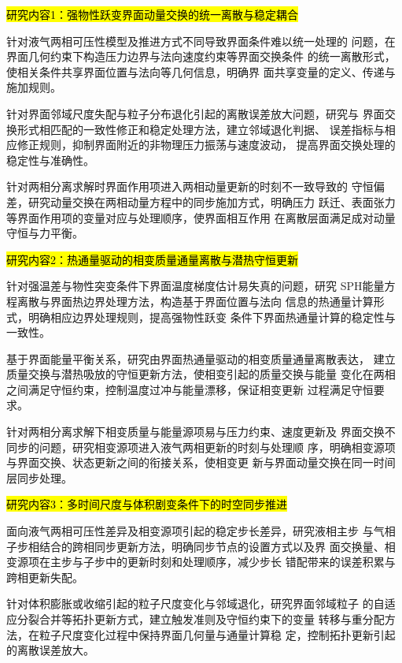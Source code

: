 \hl{\zhhei 研究内容1：强物性跃变界面动量交换的统一离散与稳定耦合}

针对液气两相可压性模型及推进方式不同导致界面条件难以统一处理的
问题，在界面几何约束下构造压力边界与法向速度约束等界面交换条件
的统一离散形式，使相关条件共享界面位置与法向等几何信息，明确界
面共享变量的定义、传递与施加规则。

针对界面邻域尺度失配与粒子分布退化引起的离散误差放大问题，研究与
界面交换形式相匹配的一致性修正和稳定处理方法，建立邻域退化判据、
误差指标与相应修正规则，抑制界面附近的非物理压力振荡与速度波动，
提高界面交换处理的稳定性与准确性。

针对两相分离求解时界面作用项进入两相动量更新的时刻不一致导致的
守恒偏差，研究动量交换在两相动量方程中的同步施加方式，明确压力
跃迁、表面张力等界面作用项的变量对应与处理顺序，使界面相互作用
在离散层面满足成对动量守恒与力平衡。

\hl{\zhhei 研究内容2：热通量驱动的相变质量通量离散与潜热守恒更新}

针对强温差与物性突变条件下界面温度梯度估计易失真的问题，研究
SPH能量方程离散与界面热边界处理方法，构造基于界面位置与法向
信息的热通量计算形式，明确相应边界处理规则，提高强物性跃变
条件下界面热通量计算的稳定性与一致性。

基于界面能量平衡关系，研究由界面热通量驱动的相变质量通量离散表达，
建立质量交换与潜热吸放的守恒更新方法，使相变引起的质量交换与能量
变化在两相之间满足守恒约束，控制温度过冲与能量漂移，保证相变更新
过程满足守恒要求。

针对两相分离求解下相变质量与能量源项易与压力约束、速度更新及
界面交换不同步的问题，研究相变源项进入液气两相更新的时刻与处理顺
序，明确相变源项与界面交换、状态更新之间的衔接关系，使相变更
新与界面动量交换在同一时间层同步处理。

\hl{\zhhei 研究内容3：多时间尺度与体积剧变条件下的时空同步推进}

面向液气两相可压性差异及相变源项引起的稳定步长差异，研究液相主步
与气相子步相结合的跨相同步更新方法，明确同步节点的设置方式以及界
面交换量、相变源项在主步与子步中的更新时刻和处理顺序，减少步长
错配带来的误差积累与跨相更新失配。

针对体积膨胀或收缩引起的粒子尺度变化与邻域退化，研究界面邻域粒子
的自适应分裂合并等拓扑更新方式，建立触发准则及守恒约束下的变量
转移与重分配方法，在粒子尺度变化过程中保持界面几何量与通量计算稳
定，控制拓扑更新引起的离散误差放大。

